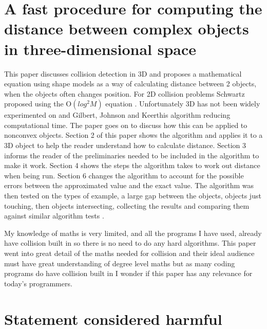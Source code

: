\documentclass{scrartcl}
\begin{document}
\section{A fast procedure for computing the distance between complex objects in three-dimensional space}

This paper discusses collision detection in 3D and proposes a mathematical equation using shape models as a way of calculating distance between 2 objects, when the objects often changes position.  For 2D collision problems Schwartz proposed using the O\((log^2  M)\) equation \cite{schwartz1981finding}. Unfortunately 3D has not been widely experimented on and Gilbert, Johnson and Keerthis algorithm reducing computational time. The paper goes on to discuss how this can be applied to nonconvex objects. Section 2 of this paper shows the algorithm and applies it to a 3D object to help the reader understand how to calculate distance. Section 3 informs the reader of the preliminaries needed to be included in the algorithm to make it work. Section 4 shows the steps the algorithm takes to work out distance when being run. Section 6 changes the algorithm to account for the possible errors between the approximated value and the exact value. The algorithm was then tested on the types of example, a large gap between the objects, objects just touching, then objects intersecting, collecting the results and comparing them against similar algorithm tests \cite{gilbert1988fast}.

My knowledge of maths is very limited, and all the programs I have used, already have collision built in so there is no need to do any hard algorithms. This paper went into great detail of the maths needed for collision and their ideal audience must have great understanding of degree level maths but as many coding programs do have collision built in I wonder if this paper has any relevance for today’s programmers.

\section{Statement considered harmful}





\end{document}
